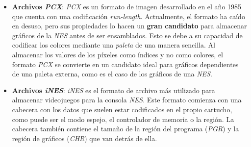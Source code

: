 \begin{itemize}
    \item \textbf{Archivos \textit{PCX}}: \textit{PCX} es un formato de imagen desarrollado
    en el año 1985 que cuenta con una codificación \textit{run-length}.
    Actualmente, el formato ha caído en desuso, pero sus propiedades
    lo hacen un \textbf{gran candidato} para almacenar gráficos
    de la \textit{NES} antes de ser ensamblados.
    Esto se debe a su capacidad de codificar los colores mediante
    una \textit{paleta} de una manera sencilla.
    Al almacenar los valores de los píxeles como índices y no
    como colores, el formato \textit{PCX} se convierte en un
    candidato ideal para gráficos dependientes de una paleta
    externa, como es el caso de los gráficos de una \textit{NES}.
    \item \textbf{Archivos \textit{iNES}}: \textit{iNES}
    es el formato de archivo más utilizado
    para almacenar videojuegos para la consola \textit{NES}.
    Este formato comienza con una cabecera con los datos que suelen
    estar codificados en el propio cartucho, como puede ser el modo
    espejo, el controlador de memoria o la región.
    La cabecera también contiene el tamaño de la región del
    programa (\textit{PGR}) y la región de gráficos (\textit{CHR})
    que van detrás de ella.
\end{itemize}